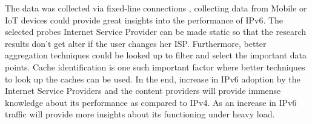 The data was collected via fixed-line connections \cite{viet}, collecting data from Mobile or IoT devices could provide great insights into the performance of IPv6. The selected probes Internet Service Provider can be made static so that the research results don't get alter if the
user changes her ISP. Furthermore, better aggregation techniques could be looked up to filter and select the important data points. Cache identification is one such important factor where better techniques to look up the caches can be used.
In the end, increase in IPv6 adoption by the Internet Service Providers and the content providers will provide immense knowledge about its performance as compared to IPv4. As an increase in IPv6 traffic will provide more insights about its functioning under heavy load.